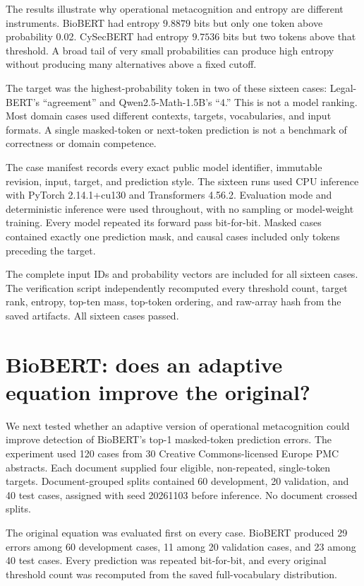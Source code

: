 \documentclass[11pt,a4paper]{article}
\begin{document}
The results illustrate why operational metacognition and entropy are different instruments. BioBERT had entropy $9.8879$ bits but only one token above probability 0.02. CySecBERT had entropy $9.7536$ bits but two tokens above that threshold. A broad tail of very small probabilities can produce high entropy without producing many alternatives above a fixed cutoff.

The target was the highest-probability token in two of these sixteen cases: Legal-BERT's ``agreement'' and Qwen2.5-Math-1.5B's ``4.'' This is not a model ranking. Most domain cases used different contexts, targets, vocabularies, and input formats. A single masked-token or next-token prediction is not a benchmark of correctness or domain competence.

The case manifest records every exact public model identifier, immutable revision, input, target, and prediction style. The sixteen runs used CPU inference with PyTorch 2.14.1+cu130 and Transformers 4.56.2. Evaluation mode and deterministic inference were used throughout, with no sampling or model-weight training. Every model repeated its forward pass bit-for-bit. Masked cases contained exactly one prediction mask, and causal cases included only tokens preceding the target.

The complete input IDs and probability vectors are included for all sixteen cases. The verification script independently recomputed every threshold count, target rank, entropy, top-ten mass, top-token ordering, and raw-array hash from the saved artifacts. All sixteen cases passed.

\section{BioBERT: does an adaptive equation improve the original?}
We next tested whether an adaptive version of operational metacognition could improve detection of BioBERT's top-1 masked-token prediction errors. The experiment used 120 cases from 30 Creative Commons-licensed Europe PMC abstracts. Each document supplied four eligible, non-repeated, single-token targets. Document-grouped splits contained 60 development, 20 validation, and 40 test cases, assigned with seed 20261103 before inference. No document crossed splits.

The original equation was evaluated first on every case. BioBERT produced 29 errors among 60 development cases, 11 among 20 validation cases, and 23 among 40 test cases. Every prediction was repeated bit-for-bit, and every original threshold count was recomputed from the saved full-vocabulary distribution.
\end{document}
